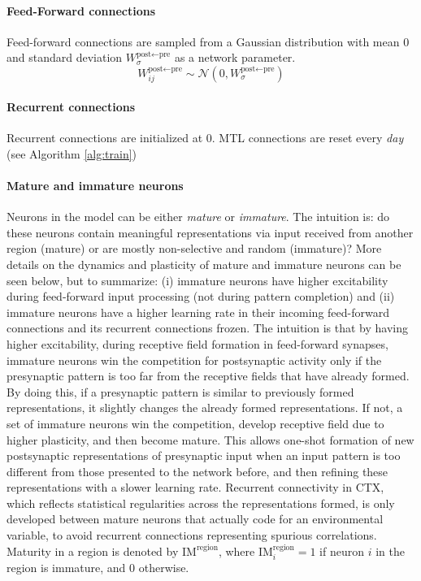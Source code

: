 \documentclass{article}
\begin{document}
\paragraph{Feed-Forward connections}
Feed-forward connections are sampled from a Gaussian distribution with mean 0 and standard deviation $W^{\textrm{post}\leftarrow\textrm{pre}}_\sigma$ as a network parameter.
\begin{equation}
    W^{\textrm{post}\leftarrow\textrm{pre}}_{ij} \sim \mathcal{N}(0, W^{\textrm{post}\leftarrow\textrm{pre}}_\sigma)
\end{equation}
\paragraph{Recurrent connections}
Recurrent connections are initialized at 0. MTL connections are reset every \textit{day} (see Algorithm \ref{alg:train})
\paragraph{Mature and immature neurons} Neurons in the model can be either \textit{mature} or \textit{immature}. The intuition is: do these neurons contain meaningful representations via input received from another region (mature) or are mostly non-selective and random (immature)? More details on the dynamics and plasticity of mature and immature neurons can be seen below, but to summarize: (i) immature neurons have higher excitability during feed-forward input processing (not during pattern completion) and (ii) immature neurons have a higher learning rate in their incoming feed-forward connections and its recurrent connections frozen. The intuition is that by having higher excitability, during receptive field formation in feed-forward synapses, immature neurons win the competition for postsynaptic activity only if the presynaptic pattern is too far from the receptive fields that have already formed. By doing this, if a presynaptic pattern is similar to previously formed representations, it slightly changes the already formed representations. If not, a set of immature neurons win the competition, develop receptive field due to higher plasticity, and then become mature. This allows one-shot formation of new postsynaptic representations of presynaptic input when an input pattern is too different from those presented to the network before, and then refining these representations with a slower learning rate. Recurrent connectivity in CTX, which reflects statistical regularities across the representations formed, is only developed between mature neurons that actually code for an environmental variable, to avoid recurrent connections representing spurious correlations. Maturity in a region is denoted by $\textrm{IM}^\textrm{region}$, where $\textrm{IM}^\textrm{region}_i = 1$ if neuron $i$ in the region is immature, and 0 otherwise.
\end{document}
